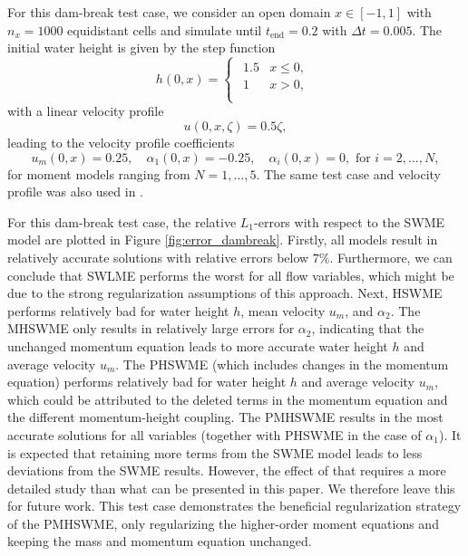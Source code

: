 \documentclass[a4paper, 11pt]{article}
\begin{document}
For this dam-break test case, we consider an open domain $x\in [-1,1]$ with $n_x=1000$ equidistant cells and simulate until $t_{\textrm{end}}=0.2$ with $\Delta t = 0.005$. The initial water height is given by the step function
\begin{equation}
    h(0,x) = \begin{cases}
\begin{array}{cc}
 1.5 & x \leq 0, \\
 1 & x > 0, \\
\end{array}
\end{cases}
\end{equation}
with a linear velocity profile
\begin{equation}
    u(0,x,\zeta) = 0.5 \zeta,
\end{equation}
leading to the velocity profile coefficients
\begin{equation}
    u_m(0,x) = 0.25, \quad \alpha_1(0,x) = -0.25, \quad \alpha_i(0,x) = 0, \text{ for } i = 2,\ldots, N,
\end{equation}
for moment models ranging from $N=1,\ldots,5$.
The same test case and velocity profile was also used in \cite{Koellermeier2020i}.

For this dam-break test case, the relative $L_1$-errors with respect to the SWME model are plotted in Figure \ref{fig:error_dambreak}. %
Firstly, all models result in relatively accurate solutions with relative errors below $7\%$. Furthermore, we can conclude that SWLME performs the worst for all flow variables, which might be due to the strong regularization assumptions of this approach. Next, HSWME performs relatively bad for water height $h$, mean velocity $u_m$, and $\alpha_2$. The MHSWME only results in relatively large errors for $\alpha_2$, indicating that the unchanged momentum equation leads to more accurate water height $h$ and average velocity $u_m$. The PHSWME (which includes changes in the momentum equation) performs relatively bad for water height $h$ and average velocity $u_m$, which could be attributed to the deleted terms in the momentum equation and the different momentum-height coupling. The PMHSWME results in the most accurate solutions for all variables (together with PHSWME in the case of $\alpha_1$). It is expected that retaining more terms from the SWME model leads to less deviations from the SWME results. However, the effect of that requires a more detailed study than what can be presented in this paper. We therefore leave this for future work.
This test case demonstrates the beneficial regularization strategy of the PMHSWME, only regularizing the higher-order moment equations and keeping the mass and momentum equation unchanged.
\end{document}

